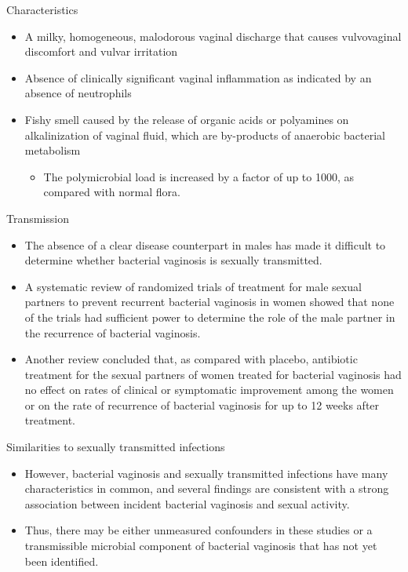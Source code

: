 \documentclass{beamer}
\begin{document}
\begin{frame}{Characteristics}
    \begin{itemize}
        \item A milky, homogeneous, malodorous vaginal discharge that causes
              vulvovaginal discomfort and vulvar irritation
        \item Absence of clinically significant vaginal inflammation as
              indicated by an absence of neutrophils
        \item Fishy smell caused by the release of organic acids or polyamines
              on alkalinization of vaginal fluid, which are by-products of
              anaerobic bacterial metabolism
            \begin{itemize}
                \item The polymicrobial load is increased by a factor of up to
                      1000, as compared with normal flora.
        \end{itemize}
    \end{itemize}
\end{frame}

\begin{frame}{Transmission}
    \begin{itemize}
        \item The absence of a clear disease counterpart in males has made it
              difficult to determine whether bacterial vaginosis is sexually
              transmitted.
        \item A systematic review of randomized trials of treatment for male
              sexual partners to prevent recurrent bacterial vaginosis in women
              showed that none of the trials had sufficient power to determine
              the role of the male partner in the recurrence of bacterial
              vaginosis.
        \item Another review concluded that, as compared with placebo,
              antibiotic treatment for the sexual partners of women treated for
              bacterial vaginosis had no effect on rates of clinical or
              symptomatic improvement among the women or on the rate of
              recurrence of bacterial vaginosis for up to 12 weeks after
              treatment.
    \end{itemize}
\end{frame}

\begin{frame}{Similarities to sexually transmitted infections}
    \begin{itemize}
        \item However, bacterial vaginosis and sexually transmitted infections
              have many characteristics in common, and several findings are
              consistent with a strong association between incident bacterial
              vaginosis and sexual activity.
        \item Thus, there may be either unmeasured confounders in these studies
              or a transmissible microbial component of bacterial vaginosis
              that has not yet been identified.
    \end{itemize}
\end{frame}
\end{document}

